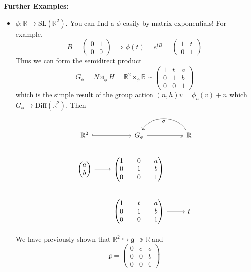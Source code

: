 \documentclass[12pt]{article}
\newcommand{\R}{\mathbb{R}}
\newcommand{\SL}{\text{SL}}
\newcommand{\g}{\mathfrak{g}}
\begin{document}
    \textbf{Further Examples:} 
    \begin{itemize}
        \item $\phi: \R \to \SL(\R^2)$. You can find a $\phi$ easily by matrix exponentials! For example, 
        \[B = \begin{pmatrix}
            0 & 1\\ 
            0 & 0
        \end{pmatrix} \implies \phi(t) = e^{tB} = \begin{pmatrix}
            1 & t\\ 
            0 & 1
        \end{pmatrix}\] 
        Thus we can form the semidirect product
        \[G_{\phi} = N \rtimes_{\phi} H = \R^2 \rtimes_{\phi} \R \sim \begin{pmatrix}
            1 & t & a\\ 
            0 & 1 & b\\
            0 & 0 & 1
        \end{pmatrix}\]
        which is the simple result of the group action $(n, h)v = \phi_h(v) + n$ which $G_{\phi} \mapsto \text{Diff}(\R^2)$. Then 
        \[\begin{tikzcd}
            \R^2 \arrow[hook]{r} & G_{\phi} \arrow[two heads]{r} & \R \arrow[bend right=60]{l}{\sigma}\\ 
            \begin{pmatrix}
                a\\b
            \end{pmatrix} \arrow{r} & \begin{pmatrix}
                1 & 0 & a\\ 
                0 & 1 & b\\ 
                0 & 0 & 1
            \end{pmatrix} & \\ 
            & \begin{pmatrix}
                1 & t & a\\ 
                0 & 1 & b\\ 
                0 & 0 & 1
            \end{pmatrix} \arrow{r} & t
        \end{tikzcd}\]

        We have previously shown that $\R^2 \hookrightarrow \g \twoheadrightarrow \R$ and 
        \[\g = \begin{pmatrix}
            0 & c & a\\ 
            0 & 0 & b\\ 
            0 & 0 & 0
        \end{pmatrix}\]


\end{itemize}
\end{document}
